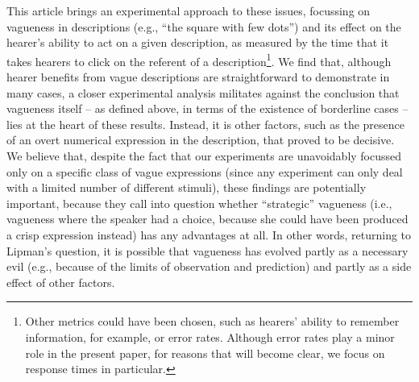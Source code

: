This article brings an experimental approach to these issues, focussing on vagueness in descriptions (e.g., ``the square with few dots'') and its effect on the hearer's ability to act on a given description, as measured by the time that it takes hearers to click on the referent of a description\footnote{Other metrics could have been chosen, such as hearers' ability to remember information, for example, or error rates. Although error rates play a minor role in the present paper, for reasons that will become clear, we focus on response times in particular.}. We find that, although hearer benefits from vague descriptions are straightforward to demonstrate in many cases, a closer experimental analysis militates against the conclusion that vagueness itself -- as defined above, in terms of the existence of borderline cases -- lies at the heart of these results. Instead, it is other factors, such as the presence of an overt numerical expression in the description, that proved to be decisive. We believe that, despite the fact that our experiments are unavoidably focussed only on a specific class of vague expressions (since any experiment can only deal with a limited number of different stimuli), these findings are potentially important, because they call into question whether ``strategic'' vagueness (i.e., vagueness where the speaker had a choice, because she could have been produced a crisp expression instead) has any advantages at all. In other words, returning to Lipman's question, it is possible that vagueness has evolved partly as a necessary evil (e.g., because of the limits of observation and prediction) and partly as a side effect of other factors.
